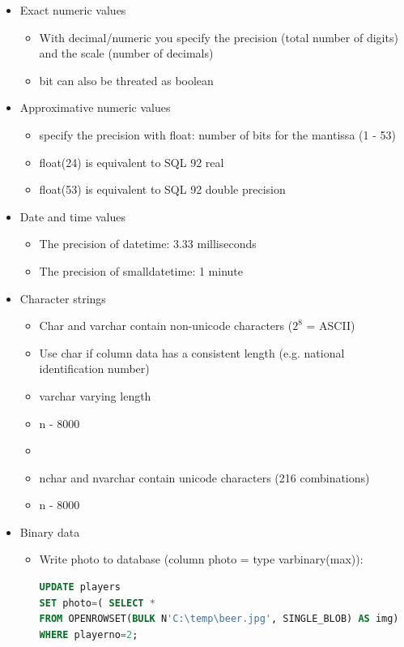 \documentclass{report}
\begin{document}
    \begin{itemize}  
        \item Exact numeric values
        \begin{itemize}
            \item With decimal/numeric you specify the precision (total number of digits) and the scale (number of decimals)
            \item bit can also be threated as boolean
        \end{itemize}
        \item Approximative numeric values
        \begin{itemize}
            \item specify the precision with float: number of bits for the mantissa (1 - 53)
            \item float(24) is equivalent to SQL 92 real
            \item float(53) is equivalent to SQL 92 double precision
        \end{itemize}
        \item Date and time values
        \begin{itemize}
            \item The precision of datetime: 3.33 milliseconds
            \item The precision of smalldatetime: 1 minute
        \end{itemize}
        \item Character strings
        \begin{itemize}
            \item Char and varchar contain non-unicode characters ($2^8$ = ASCII)
            \item Use char if column data has a consistent length (e.g. national identification number)
            \item varchar varying length
            \item n  - 8000
            \item 
            \item nchar and nvarchar contain unicode characters (216 combinations)
            \item n  - 8000
        \end{itemize}
        \item Binary data
        \begin{itemize}
            \item Write photo to database (column photo = type varbinary(max)):
\begin{lstlisting}[language=SQL]
UPDATE players
SET photo=( SELECT *
FROM OPENROWSET(BULK N'C:\temp\beer.jpg', SINGLE_BLOB) AS img)
WHERE playerno=2;\end{lstlisting}
        \end{itemize}
        
    \end{itemize}
\end{document}
